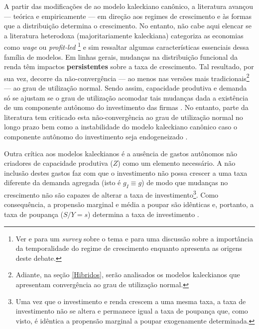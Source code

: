 A partir das modificações de \textcite{bhaduri_unemployment_1990} ao modelo kaleckiano canônico, a literatura avançou --- teórica e empiricamente --- em direção aos regimes de crescimento e às formas que a distribuição determina o crescimento.
No entanto, não  cabe aqui elencar se a  literatura heterodoxa (majoritariamente kaleckiana)  categoriza as economias como \textit{wage} ou \textit{profit-led}
\footnote{Ver 
	\textcite{setterfield_distribution_2002} 
	e \textcite{onaran_is_2013} para um  \textit{survey} sobre o tema e \textcite{blecker_wage_led_2016} para uma discussão sobre a importância da temporalidade do regime de crescimento enquanto \textcite{lavoie_origins_2017} apresenta as origens deste debate.} 
e sim ressaltar algumas  características essenciais dessa família de modelos. Em linhas gerais, mudanças na distribuição funcional da renda têm impactos \textbf{persistentes} sobre a taxa de crescimento. 
Tal resultado, por sua vez, decorre da não-convergência --- ao menos nas versões mais tradicionais\footnote{
	Adiante, na seção \ref{Hibridos}, serão analisados os modelos kaleckianos que apresentam convergência ao grau de utilização normal.
} --- ao grau de utilização normal. Sendo assim, capacidade produtiva e demanda só se ajustam se o grau de utilização acomodar tais mudanças dada a existência de um componente autônomo do investimento das firmas \cite[p.~84--86]{serrano_sraffian_2017}.
No entanto, parte da literatura tem criticado esta não-convergência ao grau de utilização normal no longo prazo \cites{skott_finance_1988}{skott_theoretical_2012}
bem como a instabilidade do modelo kaleckiano canônico caso o componente autônomo do investimento seja endogeneizado \cites{hein_harrodian_2012}{allain_tackling_2015}{nah_long-run_2017}.

Outra crítica aos modelos kaleckianos é a ausência de gastos autônomos não criadores de capacidade produtiva ($Z$) como um elemento necessário.
A não inclusão destes gastos faz com que o investimento não possa crescer a uma taxa diferente da demanda agregada (isto é $g_I \equiv g$) de modo que mudanças no crescimento não são capazes de alterar a taxa de investimento\footnote{Uma vez que o investimento e renda crescem a uma mesma taxa, a taxa de investimento não se altera e permanece igual a taxa de poupança que, como visto, é idêntica a propensão marginal a poupar exogenamente determinada.}. 
Como consequência, a propensão marginal e média a poupar são idênticas e, portanto, a taxa de poupança ($S/Y = s$) determina a taxa de investimento \cite[p.~5--7]{fagundes_role_2017}.


